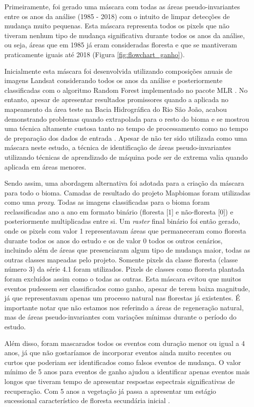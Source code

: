 Primeiramente, foi gerado uma máscara com todas as áreas pseudo-invariantes entre os anos da análise (1985 - 2018) com o intuito de limpar detecções de mudança muito pequenas. Esta máscara representa todos os pixels que não tiveram nenhum tipo de mudança significativa durante todos os anos da análise, ou seja, áreas que em 1985 já eram consideradas floresta e que se mantiveram praticamente iguais até 2018 (Figura \ref{fig:flowchart_ganho}). 

Inicialmente esta máscara foi desenvolvida utilizando composições anuais de imagens Landsat considerando todos os anos da análise e posteriormente classificadas com o algoritmo Random Forest implementado no pacote MLR \citep{mlr}. No entanto, apesar de apresentar resultados promissores quando a aplicada no mapeamento da área teste na Bacia Hidrográfica do Rio São João, acabou demonstrando problemas quando extrapolada para o resto do bioma e se mostrou uma técnica altamente custosa tanto no tempo de processamento como no tempo de preparação dos dados de entrada \citep{LACERDA2021}. Apesar de não ter sido utilizada como uma máscara neste estudo, a técnica de identificação de áreas pseudo-invariantes utilizando técnicas de aprendizado de máquina pode ser de extrema valia quando aplicada em áreas menores.

Sendo assim, uma abordagem alternativa foi adotada para a criação da máscara para todo o bioma. Camadas de resultado do projeto Mapbiomas foram utilizadas como uma \textit{proxy}. Todas as imagens classificadas para o bioma foram reclassificadas ano a ano em formato binário (floresta [1] e não-floresta [0]) e posteriormente multiplicadas entre si. Um \textit{raster} final binário foi então gerado, onde os pixels com valor 1 representavam áreas que permaneceram como floresta durante todos os anos do estudo e os de valor 0 todos os outros cenários, incluindo além de áreas que presenciaram algum tipo de mudança maior, todas as outras classes mapeadas pelo projeto. Somente pixels da classe floresta (classe número 3) da série 4.1 foram utilizados. Pixels de classes como floresta plantada foram excluídos assim como o todas as outras. Esta máscara evitou que muitos eventos pudessem ser classificados como ganho, apesar de terem baixa magnitude, já que representavam apenas um processo natural nas florestas já existentes. É importante notar que não estamos nos referindo a áreas de regeneração natural, mas de áreas pseudo-invariantes com variações mínimas durante o período do estudo. 

Além disso, foram mascarados todos os eventos com duração menor ou igual a 4 anos, já que não gostaríamos de incorporar eventos ainda muito recentes ou curtos que poderiam ser identificados como falsos eventos de mudança. O valor mínimo de 5 anos para eventos de ganho ajudou a identificar apenas eventos mais longos que tiveram tempo de apresentar respostas espectrais significativas de recuperação. Com 5 anos a vegetação já passa a apresentar um estágio sucessional característico de floresta secundária inicial \citep{Chazdon2014}. 

